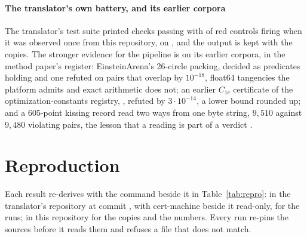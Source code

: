\documentclass[preprint,11pt,authoryear,a4paper]{elsarticle}
\begin{document}
\paragraph{The translator's own battery, and its earlier corpora} The translator's test suite printed \RfClaimboxChecks{} checks passing with \RfClaimboxReds{} of \RfClaimboxReds{} red controls firing when it was observed once from this repository, on \RfBatteryDate{}, and the output is kept with the copies. The stronger evidence for the pipeline is on its earlier corpora, in the method paper's register: EinsteinArena's 26-circle packing, decided as \RfCirclePredicatesCertified{} predicates holding and one refuted on \RfCircleViolating{} pairs that overlap by $10^{-18}$, float64 tangencies the platform admits and exact arithmetic does not; an earlier $C_{1c}$ certificate of the optimization-constants registry, \RfPrimClaim, refuted by $3\cdot10^{-14}$, a lower bound rounded up; and a 605-point kissing record read two ways from one byte string, $9{,}510$ against $9{,}480$ violating pairs, the lesson that a reading is part of a verdict \citep{Register}.

\section{Reproduction}\label{app:repro}\setcounter{table}{0}

Each result re-derives with the command beside it in Table~\ref{tab:repro}: in the translator's repository at commit \texttt{\RfClaimboxCommit}, with cert-machine beside it read-only, for the runs; in this repository for the copies and the numbers. Every run re-pins the sources before it reads them and refuses a file that does not match.
\end{document}
